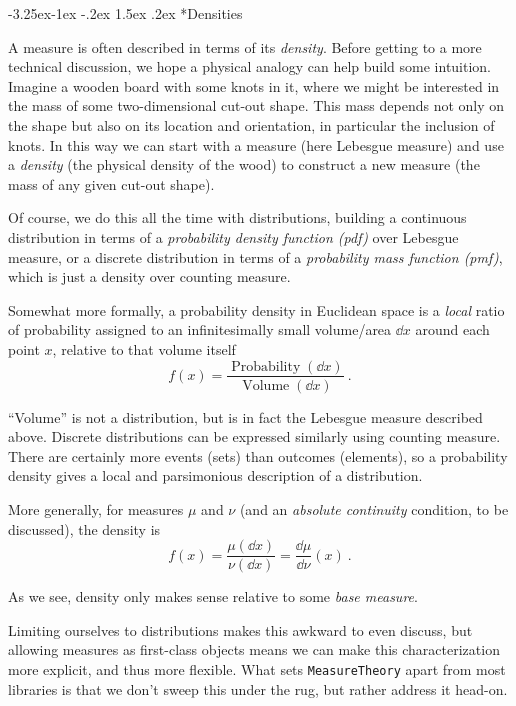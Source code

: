 \documentclass{juliacon}
\makeatletter
\renewcommand\subsection{\@startsection{subsection}{2}{\z@}%
{-3.25ex\@plus -1ex \@minus -.2ex}%
{1.5ex \@plus .2ex}%
{\normalfont\bfseries}}
\makeatother
\begin{document}
 

\subsection*{Densities}

A measure is often described in terms of its \emph{density}. Before getting to a more technical discussion, we hope a physical analogy can help build some intuition. Imagine a wooden board with some knots in it, where we might be interested in the mass of some two-dimensional cut-out shape. This mass depends not only on the shape but also on its location and orientation, in particular the inclusion of knots. In this way we can start with a measure (here Lebesgue measure) and use a \emph{density} (the physical density of the wood) to construct a new measure (the mass of any given cut-out shape).


Of course, we do this all the time with distributions, building a continuous distribution in terms of a \emph{probability density function (pdf)} over Lebesgue measure, or a discrete distribution in terms of a \emph{probability mass function (pmf)}, which is just a density over counting measure. 

Somewhat more formally, a probability density in Euclidean space is a \emph{local} ratio of probability assigned to an infinitesimally small volume/area $\dd x$ around each point $x$, relative to that volume itself
\[
f(x) = \frac{\operatorname{Probability}(\dd x)}{\operatorname{Volume}(\dd x)} \ .
\]

``Volume'' is not a distribution, but is in fact the Lebesgue measure described above. Discrete distributions can be expressed similarly using counting measure. 
There are certainly more events (sets) than outcomes (elements), so a probability density gives a local and parsimonious description of a distribution.

More generally, for measures $\mu$ and $\nu$ (and an \emph{absolute continuity} condition, to be discussed), the density is
\[
f(x) = \frac{\mu(\dd x)}{\nu(\dd x)} = \frac{\dd\mu}{\dd\nu}(x)\ .
\]

As we see, density only makes sense relative to some \emph{base measure}.

Limiting ourselves to distributions makes this awkward to even discuss, but allowing measures as first-class objects means we can make this characterization more explicit, and thus more flexible. What sets \verb|MeasureTheory| apart from most libraries is that we don't sweep this under the rug, but rather address it head-on. 
\end{document}
